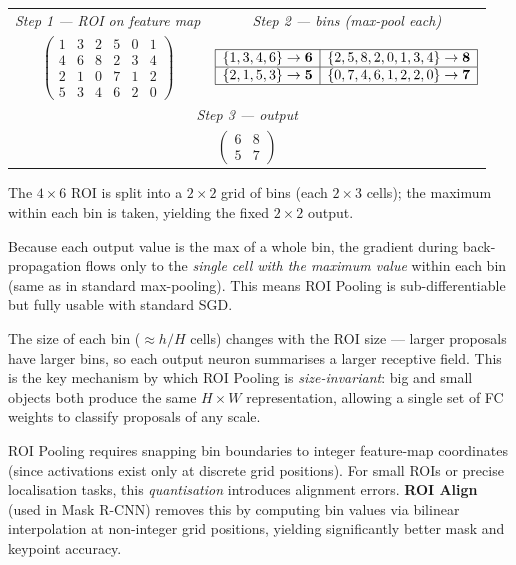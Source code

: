 \documentclass[11pt,a4paper]{article}
\begin{document}
\medskip
\begin{center}
\renewcommand{\arraystretch}{1.3}
\begin{tabular}{cc}
  \textit{Step 1 — ROI on feature map} & \textit{Step 2 — bins (max-pool each)} \\[4pt]
  $\begin{pmatrix}
    1 & 3 & 2 & 5 & 0 & 1 \\
    4 & 6 & 8 & 2 & 3 & 4 \\
    2 & 1 & 0 & 7 & 1 & 2 \\
    5 & 3 & 4 & 6 & 2 & 0
  \end{pmatrix}$
  &
  $\begin{array}{|c|c|}
    \hline
    \{1,3,4,6\}\to\mathbf{6} & \{2,5,8,2,0,1,3,4\}\to\mathbf{8} \\
    \hline
    \{2,1,5,3\}\to\mathbf{5} & \{0,7,4,6,1,2,2,0\}\to\mathbf{7} \\
    \hline
  \end{array}$
  \\[10pt]
  \multicolumn{2}{c}{\textit{Step 3 — output}}\\[4pt]
  \multicolumn{2}{c}{$\begin{pmatrix} 6 & 8 \\ 5 & 7 \end{pmatrix}$}
\end{tabular}
\end{center}
\medskip

The $4\times6$ ROI is split into a $2\times2$ grid of bins (each $2\times3$ cells);
the maximum within each bin is taken, yielding the fixed $2\times2$ output.

\begin{insightbox}
Because each output value is the max of a whole bin, the gradient during back-propagation flows
only to the \emph{single cell with the maximum value} within each bin (same as in standard
max-pooling).  This means ROI Pooling is sub-differentiable but fully usable with standard SGD.

The size of each bin ($\approx h/H$ cells) changes with the ROI size — larger proposals have larger
bins, so each output neuron summarises a larger receptive field.  This is the key mechanism by which
ROI Pooling is \emph{size-invariant}: big and small objects both produce the same $H \times W$
representation, allowing a single set of FC weights to classify proposals of any scale.
\end{insightbox}

\begin{warnbox}
ROI Pooling requires snapping bin boundaries to integer feature-map coordinates (since activations
exist only at discrete grid positions).  For small ROIs or precise localisation tasks, this
\emph{quantisation} introduces alignment errors.  \textbf{ROI Align} (used in Mask R-CNN) removes
this by computing bin values via bilinear interpolation at non-integer grid positions, yielding
significantly better mask and keypoint accuracy.
\end{warnbox}
\end{document}
